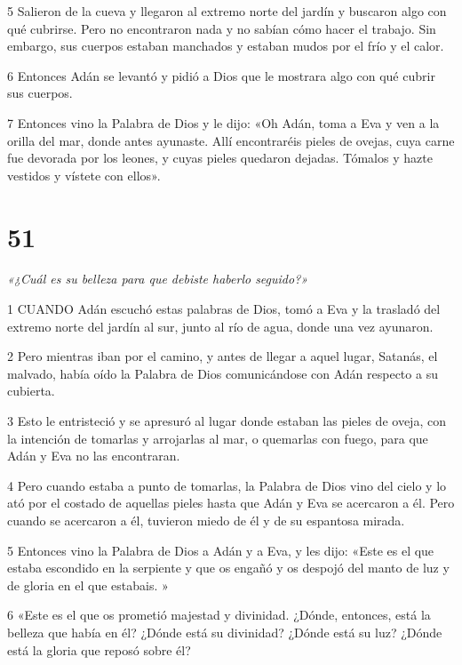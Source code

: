 \par 5 Salieron de la cueva y llegaron al extremo norte del jardín y buscaron algo con qué cubrirse. Pero no encontraron nada y no sabían cómo hacer el trabajo. Sin embargo, sus cuerpos estaban manchados y estaban mudos por el frío y el calor.

\par 6 Entonces Adán se levantó y pidió a Dios que le mostrara algo con qué cubrir sus cuerpos.

\par 7 Entonces vino la Palabra de Dios y le dijo: «Oh Adán, toma a Eva y ven a la orilla del mar, donde antes ayunaste. Allí encontraréis pieles de ovejas, cuya carne fue devorada por los leones, y cuyas pieles quedaron dejadas. Tómalos y hazte vestidos y vístete con ellos».

\chapter{51}

\par \textit{«¿Cuál es su belleza para que debiste haberlo seguido?»}

\par 1 CUANDO Adán escuchó estas palabras de Dios, tomó a Eva y la trasladó del extremo norte del jardín al sur, junto al río de agua, donde una vez ayunaron.

\par 2 Pero mientras iban por el camino, y antes de llegar a aquel lugar, Satanás, el malvado, había oído la Palabra de Dios comunicándose con Adán respecto a su cubierta.

\par 3 Esto le entristeció y se apresuró al lugar donde estaban las pieles de oveja, con la intención de tomarlas y arrojarlas al mar, o quemarlas con fuego, para que Adán y Eva no las encontraran.

\par 4 Pero cuando estaba a punto de tomarlas, la Palabra de Dios vino del cielo y lo ató por el costado de aquellas pieles hasta que Adán y Eva se acercaron a él. Pero cuando se acercaron a él, tuvieron miedo de él y de su espantosa mirada.

\par 5 Entonces vino la Palabra de Dios a Adán y a Eva, y les dijo: «Este es el que estaba escondido en la serpiente y que os engañó y os despojó del manto de luz y de gloria en el que estabais. »

\par 6 «Este es el que os prometió majestad y divinidad. ¿Dónde, entonces, está la belleza que había en él? ¿Dónde está su divinidad? ¿Dónde está su luz? ¿Dónde está la gloria que reposó sobre él?

